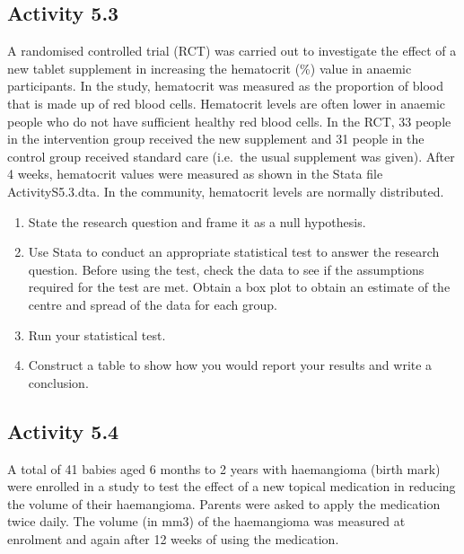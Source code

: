 \documentclass[
]{memoir}
\providecommand{\tightlist}{%
  \setlength{\itemsep}{0pt}\setlength{\parskip}{0pt}}
\begin{document}
\hypertarget{activity-5.3}{%
\subsection*{Activity 5.3}\label{activity-5.3}}

A randomised controlled trial (RCT) was carried out to investigate the effect of a new tablet supplement in increasing the hematocrit (\%) value in anaemic participants. In the study, hematocrit was measured as the proportion of blood that is made up of red blood cells. Hematocrit levels are often lower in anaemic people who do not have sufficient healthy red blood cells. In the RCT, 33 people in the intervention group received the new supplement and 31 people in the control group received standard care (i.e.~the usual supplement was given). After 4 weeks, hematocrit values were measured as shown in the Stata file ActivityS5.3.dta. In the community, hematocrit levels are normally distributed.

\begin{enumerate}
\def\labelenumi{\alph{enumi})}
\tightlist
\item
  State the research question and frame it as a null hypothesis.
\item
  Use Stata to conduct an appropriate statistical test to answer the research question. Before using the test, check the data to see if the assumptions required for the test are met. Obtain a box plot to obtain an estimate of the centre and spread of the data for each group.
\item
  Run your statistical test.
\item
  Construct a table to show how you would report your results and write a conclusion.
\end{enumerate}

\hypertarget{activity-5.4}{%
\subsection*{Activity 5.4}\label{activity-5.4}}

A total of 41 babies aged 6 months to 2 years with haemangioma (birth mark) were enrolled in a study to test the effect of a new topical medication in reducing the volume of their haemangioma. Parents were asked to apply the medication twice daily. The volume (in mm3) of the haemangioma was measured at enrolment and again after 12 weeks of using the medication.
\end{document}
